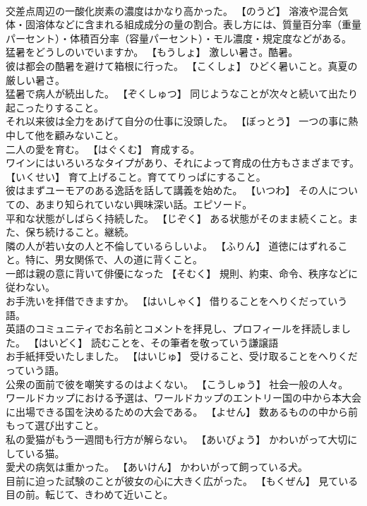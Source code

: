 \documentclass[8pt]{extreport}
\begin{document}
\begin{CJK}{UTF8}{min}
\\	交差点周辺の一酸化炭素の濃度はかなり高かった。	【のうど】 溶液や混合気体・固溶体などに含まれる組成成分の量の割合。表し方には、質量百分率（重量パーセント）・体積百分率（容量パーセント）・モル濃度・規定度などがある。
\\	猛暑をどうしのいでいますか。	【もうしょ】 激しい暑さ。酷暑。
\\	彼は都会の酷暑を避けて箱根に行った。	【こくしょ】 ひどく暑いこと。真夏の厳しい暑さ。
\\	猛暑で病人が続出した。	【ぞくしゅつ】 同じようなことが次々と続いて出たり起こったりすること。
\\	それ以来彼は全力をあげて自分の仕事に没頭した。	【ぼっとう】 一つの事に熱中して他を顧みないこと。
\\	二人の愛を育む。	【はぐくむ】 育成する。
\\	ワインにはいろいろなタイプがあり、それによって育成の仕方もさまざまです。	【いくせい】 育て上げること。育ててりっぱにすること。
\\	彼はまずユーモアのある逸話を話して講義を始めた。	【いつわ】 その人についての、あまり知られていない興味深い話。エピソード。
\\	平和な状態がしばらく持続した。	【じぞく】 ある状態がそのまま続くこと。また、保ち続けること。継続。
\\	隣の人が若い女の人と不倫しているらしいよ。	【ふりん】 道徳にはずれること。特に、男女関係で、人の道に背くこと。
\\	一郎は親の意に背いて俳優になった	【そむく】 規則、約束、命令、秩序などに従わない。
\\	お手洗いを拝借できますか。	【はいしゃく】 借りることをへりくだっていう語。
\\	英語のコミュニティでお名前とコメントを拝見し、プロフィールを拝読しました。	【はいどく】 読むことを、その筆者を敬っていう謙譲語
\\	お手紙拝受いたしました。	【はいじゅ】 受けること、受け取ることをへりくだっていう語。
\\	公衆の面前で彼を嘲笑するのはよくない。	【こうしゅう】 社会一般の人々。
\\	ワールドカップにおける予選は、ワールドカップのエントリー国の中から本大会に出場できる国を決めるための大会である。	【よせん】 数あるものの中から前もって選び出すこと。
\\	私の愛猫がもう一週間も行方が解らない。	【あいびょう】 かわいがって大切にしている猫。
\\	愛犬の病気は重かった。	【あいけん】 かわいがって飼っている犬。
\\	目前に迫った試験のことが彼女の心に大きく広がった。	【もくぜん】 見ている目の前。転じて、きわめて近いこと。

\end{CJK}
\end{document}
